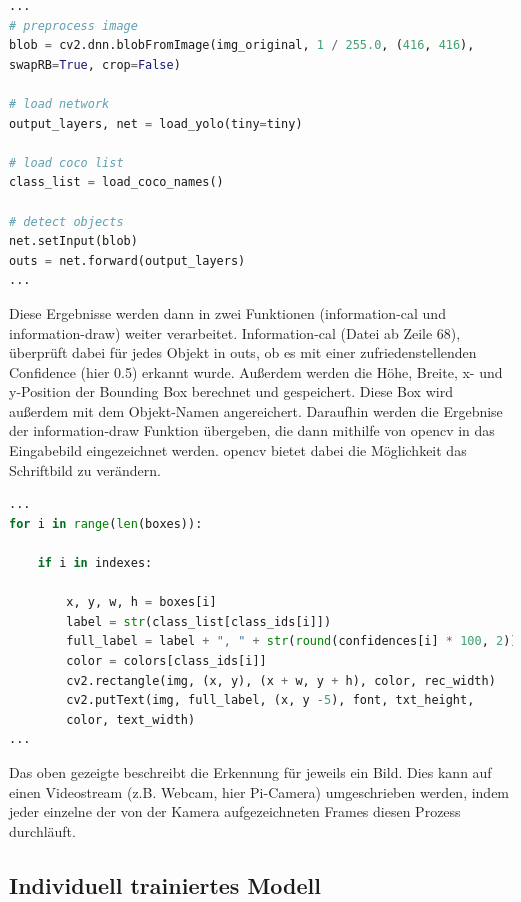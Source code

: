 \begin{lstlisting}[language=Python]
...
# preprocess image
blob = cv2.dnn.blobFromImage(img_original, 1 / 255.0, (416, 416), 
swapRB=True, crop=False)

# load network
output_layers, net = load_yolo(tiny=tiny)

# load coco list
class_list = load_coco_names()

# detect objects
net.setInput(blob)
outs = net.forward(output_layers)
...
\end{lstlisting}

Diese Ergebnisse werden dann in zwei Funktionen (information-cal und information-draw) weiter verarbeitet. Information-cal (Datei ab Zeile 68), überprüft dabei für jedes Objekt in outs, ob es mit einer zufriedenstellenden Confidence (hier 0.5) erkannt wurde. Außerdem werden die Höhe, Breite, x- und y-Position der Bounding Box berechnet und gespeichert. Diese Box wird außerdem mit dem Objekt-Namen angereichert.
Daraufhin werden die Ergebnise der information-draw Funktion übergeben, die dann mithilfe von opencv in das Eingabebild eingezeichnet werden. opencv bietet dabei die Möglichkeit das Schriftbild zu verändern.

\begin{lstlisting}[language=Python]
...
for i in range(len(boxes)):

    if i in indexes:
    
        x, y, w, h = boxes[i]
        label = str(class_list[class_ids[i]])
        full_label = label + ", " + str(round(confidences[i] * 100, 2))
        color = colors[class_ids[i]]
        cv2.rectangle(img, (x, y), (x + w, y + h), color, rec_width)
        cv2.putText(img, full_label, (x, y -5), font, txt_height,
        color, text_width)
...
\end{lstlisting}

Das oben gezeigte beschreibt die Erkennung für jeweils ein Bild. Dies kann auf einen Videostream (z.B. Webcam, hier Pi-Camera) umgeschrieben werden, indem jeder einzelne der von der Kamera aufgezeichneten Frames diesen Prozess durchläuft.

\subsection{Individuell trainiertes Modell}


